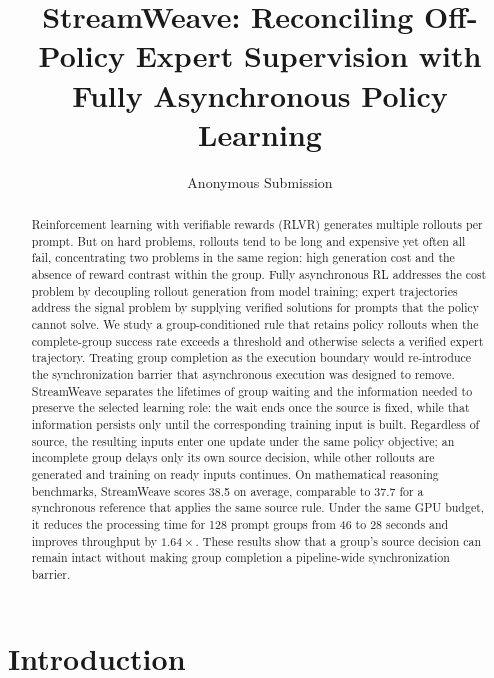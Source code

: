 \documentclass[letterpaper]{article}
\title{StreamWeave: Reconciling Off-Policy Expert Supervision with Fully Asynchronous Policy Learning}
\author{Anonymous Submission}
\begin{document}
\maketitle

\begin{abstract}
Reinforcement learning with verifiable rewards (RLVR) generates multiple rollouts per prompt.
But on hard problems, rollouts tend to be long and expensive yet often all fail, concentrating two problems in the same region: high generation cost and the absence of reward contrast within the group.
Fully asynchronous RL addresses the cost problem by decoupling rollout generation from model training; expert trajectories address the signal problem by supplying verified solutions for prompts that the policy cannot solve.
We study a group-conditioned rule that retains policy rollouts when the complete-group success rate exceeds a threshold and otherwise selects a verified expert trajectory.
Treating group completion as the execution boundary would re-introduce the synchronization barrier that asynchronous execution was designed to remove.
StreamWeave separates the lifetimes of group waiting and the information needed to preserve the selected learning role: the wait ends once the source is fixed, while that information persists only until the corresponding training input is built.
Regardless of source, the resulting inputs enter one update under the same policy objective; an incomplete group delays only its own source decision, while other rollouts are generated and training on ready inputs continues.
On mathematical reasoning benchmarks, StreamWeave scores 38.5 on average, comparable to 37.7 for a synchronous reference that applies the same source rule.
Under the same GPU budget, it reduces the processing time for 128 prompt groups from 46 to 28 seconds and improves throughput by $1.64\times$.
These results show that a group's source decision can remain intact without making group completion a pipeline-wide synchronization barrier.
\end{abstract}

\section{Introduction}
\label{sec:introduction}
\end{document}
